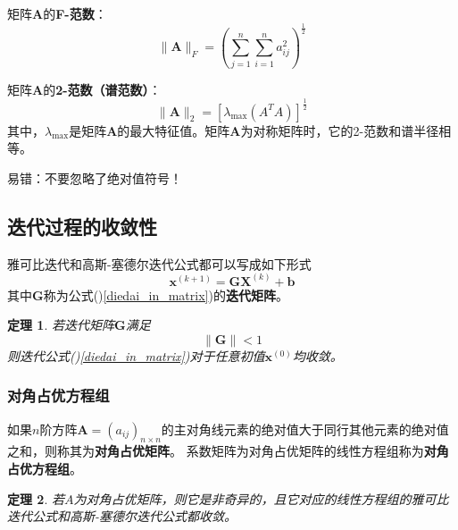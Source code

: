 \documentclass[fontset=ubuntu]{ctexart}
\newtheorem{theorem}{定理}
\numberwithin{equation}{section}
\numberwithin{theorem}{section}
\begin{document}
\begin{multicols}{2}
    矩阵$\mathbf{A}$的\textbf{F-范数}：
    \begin{equation}
        \lVert\mathbf{A}\rVert_F=\left(\sum_{j=1}^{n}\sum_{i=1}^{n}a_{ij}^2\right)^{\frac{1}{2}}
    \end{equation}

    矩阵$\mathbf{A}$的\textbf{2-范数（谱范数）}：
    \begin{equation}
        \lVert\mathbf{A}\rVert_2=\left[\lambda_\text{max}(A^T A)\right]^\frac{1}{2}
    \end{equation}
    其中，$\lambda_\text{max}$是矩阵$\mathbf{A}$的最大特征值。矩阵$\mathbf{A}$为对称矩阵时，它的2-范数和谱半径相等。

    易错：不要忽略了绝对值符号！

    \subsection{迭代过程的收敛性}

    雅可比迭代和高斯-塞德尔迭代公式都可以写成如下形式
    \begin{equation}
        \label{diedai_in_matrix}
        \mathbf{x}^{(k+1)}=\mathbf{GX}^{(k)}+\mathbf{b}
    \end{equation}
    其中$\mathbf{G}$称为公式()\ref{diedai_in_matrix})的\textbf{迭代矩阵}。

    \begin{theorem}
        若迭代矩阵$\mathbf{G}$满足
        \begin{equation}
            \lVert\mathbf{G}\rVert<1
        \end{equation}
        则迭代公式()\ref{diedai_in_matrix})对于任意初值$\mathbf{x}^{(0)}$均收敛。
    \end{theorem}

    \subsubsection{对角占优方程组}

    如果$n$阶方阵$\mathbf{A}=(a_{ij})_{n\times n}$的主对角线元素的绝对值大于同行其他元素的绝对值之和，则称其为\textbf{对角占优矩阵}。
    系数矩阵为对角占优矩阵的线性方程组称为\textbf{对角占优方程组}。

    \begin{theorem}
        若$A$为对角占优矩阵，则它是非奇异的，且它对应的线性方程组的雅可比迭代公式和高斯-塞德尔迭代公式都收敛。
    \end{theorem}

\end{multicols}
\end{document}
